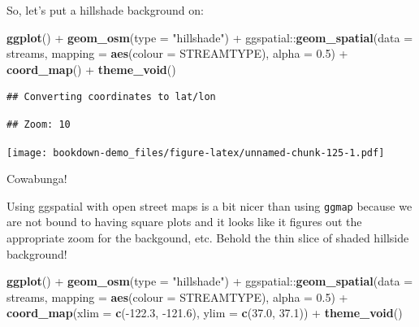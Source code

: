 \documentclass[]{book}
\newenvironment{Shaded}{\begin{snugshade}}{\end{snugshade}}
\newcommand{\KeywordTok}[1]{\textcolor[rgb]{0.13,0.29,0.53}{\textbf{{#1}}}}
\newcommand{\DataTypeTok}[1]{\textcolor[rgb]{0.13,0.29,0.53}{{#1}}}
\newcommand{\FloatTok}[1]{\textcolor[rgb]{0.00,0.00,0.81}{{#1}}}
\newcommand{\StringTok}[1]{\textcolor[rgb]{0.31,0.60,0.02}{{#1}}}
\newcommand{\NormalTok}[1]{{#1}}
\theoremstyle{definition}
\theoremstyle{definition}
\theoremstyle{remark}
\begin{document}
So, let's put a hillshade background on:

\begin{Shaded}
\begin{Highlighting}[]
\KeywordTok{ggplot}\NormalTok{() +}
\StringTok{  }\KeywordTok{geom_osm}\NormalTok{(}\DataTypeTok{type =} \StringTok{"hillshade"}\NormalTok{) +}\StringTok{ }
\StringTok{  }\NormalTok{ggspatial::}\KeywordTok{geom_spatial}\NormalTok{(}\DataTypeTok{data =} \NormalTok{streams, }\DataTypeTok{mapping =} \KeywordTok{aes}\NormalTok{(}\DataTypeTok{colour =} \NormalTok{STREAMTYPE), }\DataTypeTok{alpha =} \FloatTok{0.5}\NormalTok{) +}
\StringTok{  }\KeywordTok{coord_map}\NormalTok{() +}
\StringTok{  }\KeywordTok{theme_void}\NormalTok{()}
\end{Highlighting}
\end{Shaded}

\begin{verbatim}
## Converting coordinates to lat/lon
\end{verbatim}

\begin{verbatim}
## Zoom: 10
\end{verbatim}

\texttt{[image: bookdown-demo\_files/figure-latex/unnamed-chunk-125-1.pdf]}

Cowabunga!

Using ggspatial with open street maps is a bit nicer than using
\texttt{ggmap} because we are not bound to having square plots and it
looks like it figures out the appropriate zoom for the backgound, etc.
Behold the thin slice of shaded hillside background!

\begin{Shaded}
\begin{Highlighting}[]
\KeywordTok{ggplot}\NormalTok{() +}
\StringTok{  }\KeywordTok{geom_osm}\NormalTok{(}\DataTypeTok{type =} \StringTok{"hillshade"}\NormalTok{) +}\StringTok{ }
\StringTok{  }\NormalTok{ggspatial::}\KeywordTok{geom_spatial}\NormalTok{(}\DataTypeTok{data =} \NormalTok{streams, }\DataTypeTok{mapping =} \KeywordTok{aes}\NormalTok{(}\DataTypeTok{colour =} \NormalTok{STREAMTYPE), }\DataTypeTok{alpha =} \FloatTok{0.5}\NormalTok{) +}
\StringTok{  }\KeywordTok{coord_map}\NormalTok{(}\DataTypeTok{xlim =} \KeywordTok{c}\NormalTok{(-}\FloatTok{122.3}\NormalTok{, -}\FloatTok{121.6}\NormalTok{), }\DataTypeTok{ylim =} \KeywordTok{c}\NormalTok{(}\FloatTok{37.0}\NormalTok{, }\FloatTok{37.1}\NormalTok{)) +}
\StringTok{  }\KeywordTok{theme_void}\NormalTok{()}
\end{Highlighting}
\end{Shaded}
\end{document}
